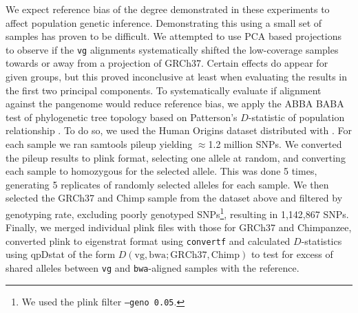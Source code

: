 We expect reference bias of the degree demonstrated in these experiments to affect population genetic inference.
Demonstrating this using a small set of samples has proven to be difficult.
We attempted to use PCA based projections to observe if the {\tt vg} alignments systematically shifted the low-coverage samples towards or away from a projection of GRCh37.
Certain effects do appear for given groups, but this proved inconclusive at least when evaluating the results in the first two principal components.
To systematically evaluate if alignment against the pangenome would reduce reference bias, we apply the ABBA BABA test of phylogenetic tree topology based on Patterson's $D$-statistic of population relationship \cite{green2010draft}.
To do so, we used the Human Origins dataset distributed with \cite{lazaridis2014ancient}.
For each sample we ran samtools pileup yielding $\approx$1.2 million SNPs.
We converted the pileup results to plink format, selecting one allele at random, and converting each sample to homozygous for the selected allele.
This was done 5 times, generating 5 replicates of randomly selected alleles for each sample.
We then selected the GRCh37 and Chimp sample from the dataset above and filtered by genotyping rate, excluding poorly genotyped SNPs\footnote{We used the plink filter {\tt --geno 0.05}.}, resulting in 1,142,867 SNPs.
Finally, we merged individual plink files with those for GRCh37 and Chimpanzee, converted plink to eigenstrat format using {\tt convertf} and calculated $D$-statistics using qpDstat \cite{patterson2012ancient} of the form $D(\text{vg}, \text{bwa}; \text{GRCh37}, \text{Chimp})$ to test for excess of shared alleles between {\tt vg} and {\tt bwa}-aligned samples with the reference.

